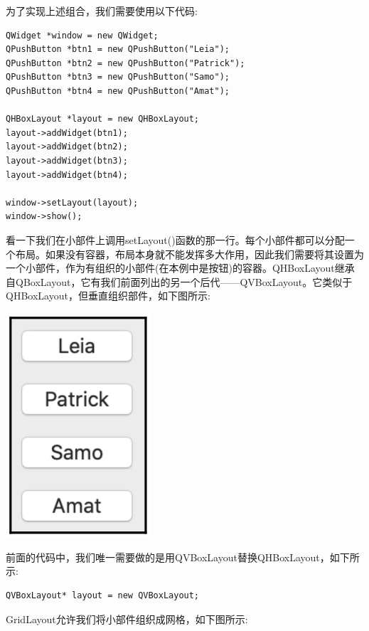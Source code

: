 为了实现上述组合，我们需要使用以下代码: \par

\begin{lstlisting}[caption={}]
QWidget *window = new QWidget;
QPushButton *btn1 = new QPushButton("Leia");
QPushButton *btn2 = new QPushButton("Patrick");
QPushButton *btn3 = new QPushButton("Samo");
QPushButton *btn4 = new QPushButton("Amat");

QHBoxLayout *layout = new QHBoxLayout;
layout->addWidget(btn1);
layout->addWidget(btn2);
layout->addWidget(btn3);
layout->addWidget(btn4);

window->setLayout(layout);
window->show();
\end{lstlisting}

看一下我们在小部件上调用setLayout()函数的那一行。每个小部件都可以分配一个布局。如果没有容器，布局本身就不能发挥多大作用，因此我们需要将其设置为一个小部件，作为有组织的小部件(在本例中是按钮)的容器。QHBoxLayout继承自QBoxLayout，它有我们前面列出的另一个后代——QVBoxLayout。它类似于QHBoxLayout，但垂直组织部件，如下图所示: \par

\begin{center}
	\includegraphics[width=0.4\textwidth]{content/Section-2/Chapter-14/17}
\end{center}

前面的代码中，我们唯一需要做的是用QVBoxLayout替换QHBoxLayout，如下所示: \par

\begin{lstlisting}[caption={}]
QVBoxLayout* layout = new QVBoxLayout;
\end{lstlisting}

GridLayout允许我们将小部件组织成网格，如下图所示: \par


